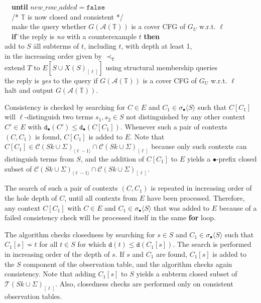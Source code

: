 \documentclass[preprint,12pt,english]{article}
\def\hole{\bullet}
\def\cA{\mathcal{A}}
\def\cC{\mathcal{C}}
\def\cT{\mathcal{T}}
\def\depth{\mathtt{d}}
\newcommand\pair[1]{\langle{#1}\rangle}
\begin{document}
\begin{tabbing}
\>\ \ {\bf until} $new\_row\_added=\mathtt{false}$\\
\>\ \ /* $\mathbb{T}$ is now closed and consistent */ \\
\>\ \ make the query whether $G(\cA(\mathbb{T}))$ is a cover CFG of $G_U$ w.r.t. $\ell$\\
\>\ \ {\bf if}\=\ the reply is {\em no} with a counterexample $t$ {\bf then}\\
\>\>add to $S$ \=all subterms of $t$, including $t$, with depth at least 1, \\
\>\>\>in the increasing order given by $\prec_{\mathtt{T}}$\\
\>\>extend $T$ to $E[S\cup X(S)_{[\ell]}]$ using structural membership queries\\
 \=the reply is {\em yes} to the query if $G(\cA(\mathbb{T}))$ is a cover CFG of $G_U$ w.r.t. $\ell$\\
\>halt and output $G(\cA(\mathbb{T}))$.
\end{tabbing}


Consistency is checked by searching for $C\in E$ and $C_1\in\sigma_\hole\pair{S}$ such that $C[C_1]$ will $\ell$-distinguish  two terms  $s_1,s_2\in S$ not distinguished by any other context  $C'\in E$ with $\depth_\hole(C')\leq\depth_\hole(C[C_1]).$ Whenever such a pair of contexts $(C,C_1)$ is found,  $C[C_1]$ is added to $E$. Note that 
$C[C_1]\in\cC(Sk\cup\Sigma)_{\pair{\ell-1}}\cap\cC(Sk\cup\Sigma)_{[\ell]}$ because only such contexts can distinguish terms from $S$, and the addition of $C[C_1]$ to $E$ yields a $\hole$-prefix closed subset of $\cC(Sk\cup\Sigma)_{\pair{\ell-1}}\cap \cC(Sk\cup\Sigma)_{[\ell]}$.


The search of such a pair of contexts $(C,C_1)$ is repeated in increasing order of the hole depth of $C$, until all contexts from $E$ have been processed. Therefore, any context $C[C_1]$ with $C\in E$ and $C_1\in\sigma_\hole\pair{S}$ that was added to $E$ because of a failed consistency check will be processed itself in the same {\bf for} loop.

The algorithm checks closedness by searching for $s\in S$ and $C_1\in\sigma_\hole\pair{S}$ such that $C_1[s]\nsim t$ for all $t\in S$ for which $\depth(t)\leq\depth(C_1[s]).$ The search is performed in increasing order of the depth of $s$. If $s$ and $C_1$ are found,  $C_1[s]$ is added to the $S$ component of the observation table, and the algorithm checks again  consistency.  Note that adding $C_1[s]$ to $S$ yields a subterm closed subset of $\cT(Sk\cup\Sigma)_{[\ell]}$. Also, closedness checks are performed only on consistent observation tables.
\end{document}
